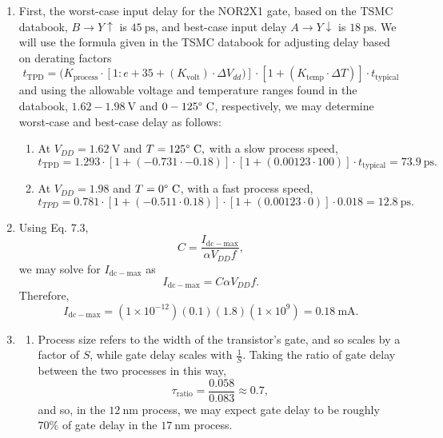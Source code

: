 \documentclass{article}
\begin{document}
\begin{enumerate}[label=\thesubsection]
		In total, this leads to an overall reduction in delay from \(500 + 500 = 1000 \ \mathrm{ps}\) to \(250 + 707 = 957 \ \mathrm{ps}\), or a 4.3\% reduction in delay.
		\setcounter{subsection}{2}
	\item 
		First, the worst-case input delay for the NOR2X1 gate, based on the TSMC databook, \(B \to Y\uparrow\) is \(45 \ \mathrm{ps}\), and best-case input delay \(A \to Y\downarrow\) is \(18 \ \mathrm{ps}\).
		We will use the formula given in the TSMC databook for adjusting delay based on derating factors
		\[
			t_{\mathrm{TPD}} = (K_{\mathrm{process}} \cdot [1:e +35 
			+ (K_{\mathrm{volt}}) \cdot \Delta V_{dd})] \cdot [1+(K_{\mathrm{temp}} \cdot \Delta T)] \cdot t_{\mathrm{typical}}
		\]
		and using the allowable voltage and temperature ranges found in the databook, \(1.62 - 1.98 \ \mathrm{V}\) and \(0 - 125 \degree \ \mathrm{C}\), respectively, we may determine worst-case and best-case delay as follows:
		\begin{enumerate}
			\item At \(V_{DD} = 1.62 \ \mathrm{V}\) and \(T = 125 \degree \ \mathrm{C},\) with a slow process speed, 
				\[
					t_{\mathrm{TPD}} = 1.293 \cdot [1 + (-0.731 \cdot -0.18)] \cdot [1 + (0.00123 \cdot 100)] \cdot t_{\mathrm{typical}} = 73.9 \ \mathrm{ps}.
				\]
			\item At \(V_{DD} = 1.98\) and \(T=0 \degree \ \mathrm{C}\), with a fast process speed,
				\[
					t_{TPD} = 0.781 \cdot [1 + (-0.511 \cdot 0.18)] \cdot [1 + (0.00123 \cdot 0)] \cdot 0.018 = 12.8 \ \mathrm{ps}.
				\]
    \end{enumerate}
		\setcounter{subsection}{3}
		\item Using Eq. 7.3,
			\[
				C = \frac{I_{\mathrm{dc-max}}}{\alpha V_{DD}f},
			\]
			we may solve for \(I_{\mathrm{dc-max}}\) as
			\[
				I_{\mathrm{dc-max}} = C \alpha V_{DD} f.
			\]
			Therefore, 
			\[
				I_{\mathrm{dc-max}} = (1 \times 10^{-12})(0.1)(1.8)(1 \times 10^9) = 0.18 \ \mathrm{mA}.
			\]
			\setcounter{subsection}{4}
		\item 
			\begin{enumerate}
				\item Process size refers to the width of the transistor's gate, and so scales by a factor of \(S\), while gate delay scales with \(\frac{1}{S}\). Taking the ratio of gate delay between the two processes in this way, 
					\[
						\tau_{\mathrm{ratio}} = \frac{0.058}{0.083} \approx 0.7,
					\]
					and so, in the \(12 \ \mathrm{nm}\) process, we may expect gate delay to be roughly \(70 \%\) of gate delay in the \(17 \ \mathrm{nm}\) process.

\end{enumerate}
\end{enumerate}
\end{document}
